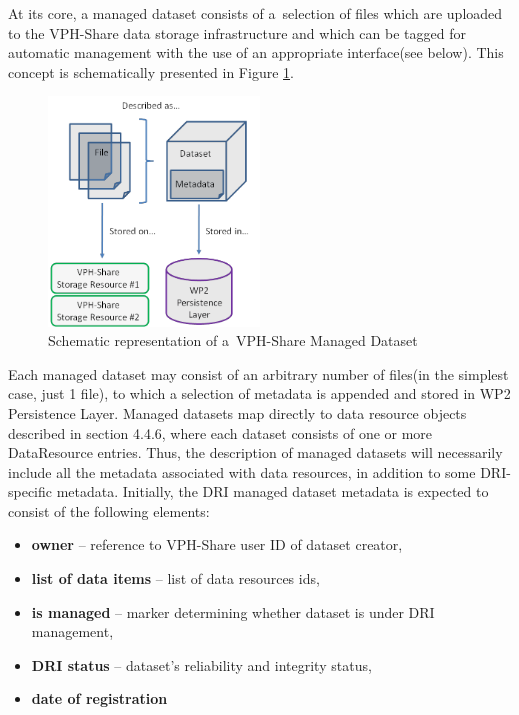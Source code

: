 \documentclass[a4paper,12pt,titlepage]{article}
\begin{document}
\noindent
At its core, a managed dataset consists of a~selection of files which are uploaded to the VPH-Share data storage infrastructure and which can be tagged for automatic management with the use of an appropriate interface(see below). This concept is schematically presented in Figure \ref{fig:managed-dataset}.\\

\begin{figure}[h!]
	\centering
	\includegraphics[width=0.5\textwidth]{img/managed-dataset.png}
	\caption{Schematic representation of a~VPH-Share Managed Dataset}
	\label{fig:managed-dataset}
\end{figure}

\noindent
Each managed dataset may consist of an arbitrary number of files(in the simplest case, just 1 file), to which a selection of metadata is appended and stored in WP2 Persistence Layer. Managed datasets map directly to data resource objects described in section 4.4.6, where each dataset consists of one or more DataResource entries. Thus, the description of managed datasets will necessarily include all the metadata associated with data resources, in addition to some DRI-specific metadata. Initially, the DRI managed dataset metadata is expected to consist of the following elements:

\begin{itemize}
\item \textbf{owner} -- reference to VPH-Share user ID of dataset creator,
\item \textbf{list of data items} -- list of data resources ids,
\item \textbf{is managed} -- marker determining whether dataset is under DRI management,
\item \textbf{DRI status} -- dataset's reliability and integrity status,
\item \textbf{date of registration}
\end{itemize}
\end{document}
